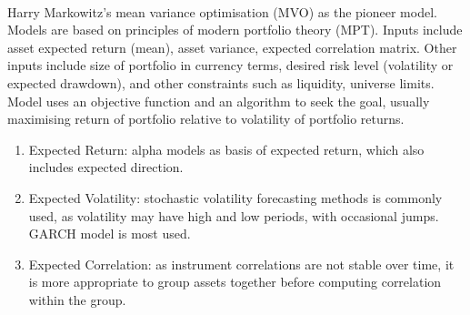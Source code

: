 \documentclass[a4paper,oneside,openany]{book}
\begin{document}
\begin{remark} \\
Harry Markowitz's mean variance optimisation (MVO) as the pioneer model. Models are based on principles of modern portfolio theory (MPT). Inputs include asset expected return (mean), asset variance, expected correlation matrix. Other inputs include size of portfolio in currency terms, desired risk level (volatility or expected drawdown), and other constraints such as liquidity, universe limits.\\
Model uses an objective function and an algorithm to seek the goal, usually maximising return of portfolio relative to volatility of portfolio returns.
\begin{enumerate}[label=\roman*.]
\setlength{\itemsep}{0pt}
\item Expected Return: alpha models as basis of expected return, which also includes expected direction.
\item Expected Volatility: stochastic volatility forecasting methods is commonly used, as volatility may have high and low periods, with occasional jumps. GARCH model is most used.
\item Expected Correlation: as instrument correlations are not stable over time, it is more appropriate to group assets together before computing correlation within the group.
\end{enumerate}
\end{remark}
\end{document}
